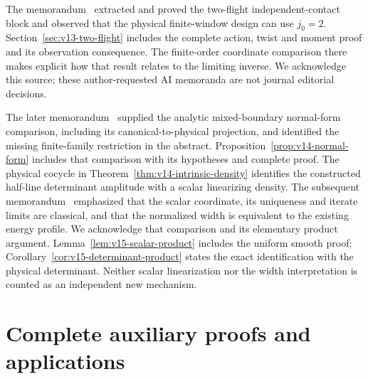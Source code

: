 The memorandum~\cite{A2ReviewV12} extracted and proved the two-flight
independent-contact block and observed that the physical finite-window
design can use $j_0=2$. Section~\ref{sec:v13-two-flight} includes the
complete action, twist and moment proof and its observation consequence.
The finite-order coordinate comparison there makes explicit how that
result relates to the limiting inverse. We acknowledge this source;
these author-requested AI memoranda are not journal editorial decisions.

The later memorandum~\cite{A2ReviewV13NF} supplied the analytic
mixed-boundary normal-form comparison, including its canonical-to-physical
projection, and identified the missing finite-family restriction in the
abstract. Proposition~\ref{prop:v14-normal-form} includes that comparison
with its hypotheses and complete proof. The physical cocycle in
Theorem~\ref{thm:v14-intrinsic-density} identifies the constructed
half-line determinant amplitude with a scalar linearizing density.
The subsequent memorandum~\cite{A2ReviewV14} emphasized that the scalar
coordinate, its uniqueness and iterate limits are classical, and that
the normalized width is equivalent to the existing energy profile.
We acknowledge that comparison and its elementary product argument.
Lemma~\ref{lem:v15-scalar-product} includes the uniform smooth proof;
Corollary~\ref{cor:v15-determinant-product} states the exact identification
with the physical determinant. Neither scalar linearization nor the
width interpretation is counted as an independent new mechanism.

\appendix
\renewcommand{\thesection}{A.\arabic{section}}
\renewcommand{\theHsection}{appendix.\arabic{section}}
\part{Complete auxiliary proofs and applications}





































